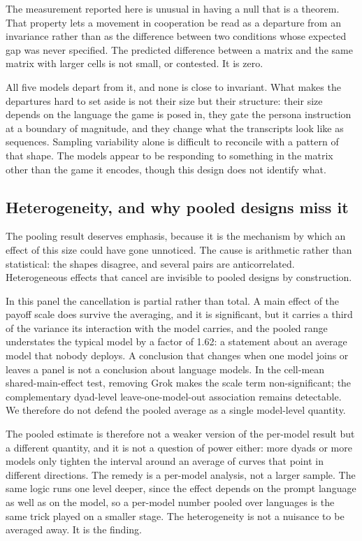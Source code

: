 \documentclass[11pt,a4paper]{article}
\begin{document}
The measurement reported here is unusual in having a null that is a theorem.
That property lets a movement in cooperation be read as a departure from an
invariance rather than as the difference between two conditions whose expected
gap was never specified. The predicted difference between a matrix and the same
matrix with larger cells is not small, or contested. It is zero.

All five models depart from it, and none is close to invariant. What makes the
departures hard to set aside is not their size but their structure: their size
depends on the language the game is posed in, they gate the persona instruction
at a boundary of magnitude, and they change what the transcripts look like as
sequences. Sampling variability alone is difficult to reconcile with a pattern
of that shape. The models appear to be responding to something in the matrix
other than the game it encodes, though this design does not identify what.

\subsection{Heterogeneity, and why pooled designs miss it}\label{sec:disc_pooling}

The pooling result deserves emphasis, because it is the mechanism by which an
effect of this size could have gone unnoticed. The cause is arithmetic rather
than statistical: the shapes disagree, and several pairs are anticorrelated.
Heterogeneous effects that cancel are invisible to pooled designs by
construction.

In this panel the cancellation is partial rather than total. A main effect of
the payoff scale does survive the averaging, and it is significant, but it
carries a third of the variance its interaction with the model carries, and the
pooled range understates the typical model by a factor of 1.62: a statement
about an average model that nobody deploys. A conclusion that changes when one
model joins or leaves a panel is not a conclusion about language models. In the
cell-mean shared-main-effect test, removing Grok makes the scale term
non-significant; the complementary dyad-level leave-one-model-out association
remains detectable. We therefore do not defend the pooled average as a single
model-level quantity.

The pooled estimate is therefore not a weaker version of the per-model result
but a different quantity, and it is not a question of power either: more dyads
or more models only tighten the interval around an average of curves that point
in different directions. The remedy is a per-model analysis, not a larger
sample. The same logic runs one level deeper, since the effect depends on the
prompt language as well as on the model, so a per-model number pooled over
languages is the same trick played on a smaller stage. The heterogeneity is not
a nuisance to be averaged away. It is the finding.
\end{document}
